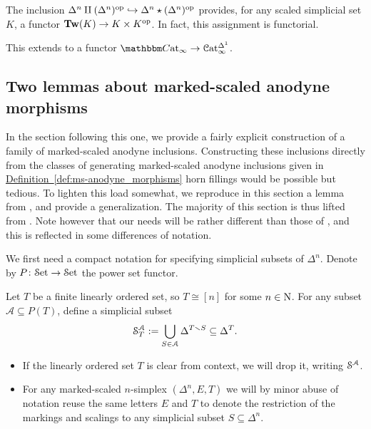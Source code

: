 \documentclass[main.tex]{subfiles}
\begin{document}
The inclusion $\Delta^{n} \amalg (\Delta^{n})\op \hookrightarrow \Delta^{n} \star (\Delta^{n})\op$ provides, for any scaled simplicial set $K$, a functor $\Tw(K) \to K \times K\op$. In fact, this assignment is functorial.

\begin{proposition}
  This extends to a functor $\ICCat \to \ICat^{\Delta^{1}}$.
\end{proposition}

\subsection{Two lemmas about marked-scaled anodyne morphisms}
\label{ssc:two_lemmas_about_marked_scaled_anodyne_morphisms}

In the section following this one, we provide a fairly explicit construction of a family of marked-scaled anodyne inclusions. Constructing these inclusions directly from the classes of generating marked-scaled anodyne inclusions given in \hyperref[def:ms-anodyne_morphisms]{Definition~\ref*{def:ms-anodyne_morphisms}} horn fillings would be possible but tedious. To lighten this load somewhat, we reproduce in this section a lemma from \cite{garcia2020enhanced}, and provide a generalization. The majority of this section is thus lifted from \cite[Section~1.2]{garcia2020enhanced}. Note however that our needs will be rather different than those of \cite{garcia2020enhanced}, and this is reflected in some differences of notation.

We first need a compact notation for specifying simplicial subsets of $\Delta^{n}$. Denote by $P\colon \Set \to \Set$ the power set functor.

\begin{definition}
  Let $T$ be a finite linearly ordered set, so $T \cong [n]$ for some $n \in \N$. For any subset $\mathcal{A} \subseteq  P(T)$, define a simplicial subset
  \begin{equation*}
    \S^{\mathcal{A}}_{T} := \bigcup_{S \in \mathcal{A}} \Delta^{T \smallsetminus S} \subseteq \Delta^{T}.
  \end{equation*}
\end{definition}

\begin{notation}
  \leavevmode
  \begin{itemize}
    \item If the linearly ordered set $T$ is clear from context, we will drop it, writing $\S^{\mathcal{A}}$.

    \item For any marked-scaled $n$-simplex $(\Delta^{n}, E, T)$ we will by minor abuse of notation reuse the same letters $E$ and $T$ to denote the restriction of the markings and scalings to any simplicial subset $S \subseteq \Delta^{n}$.
  \end{itemize}
\end{notation}
\end{document}
